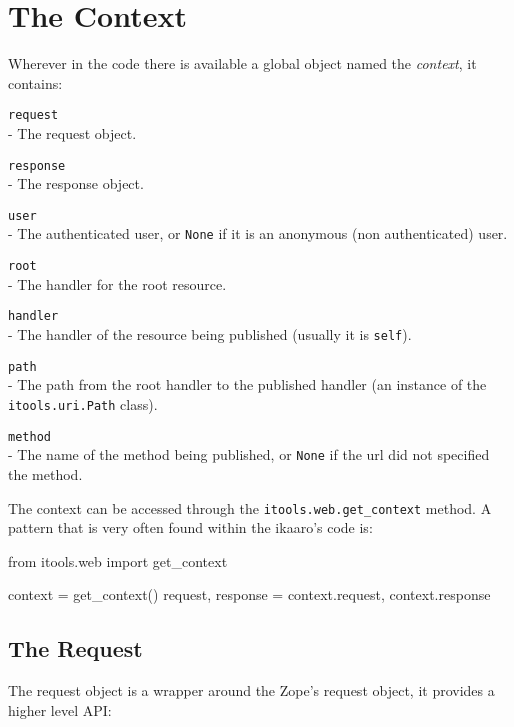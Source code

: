 \section{The Context}

Wherever in the code there is available a global object named the
{\em context}, it contains:

\begin{api}
  {\tt request}\\
  - The request object.

  {\tt response}\\
  - The response object.

  {\tt user}\\
  - The authenticated user, or {\tt None} if it is an anonymous (non
    authenticated) user.

  {\tt root}\\
  - The handler for the root resource.

  {\tt handler}\\
  - The handler of the resource being published (usually it is {\tt self}).

  {\tt path}\\
  - The path from the root handler to the published handler (an instance
    of the {\tt itools.uri.Path} class).

  {\tt method}\\
  - The name of the method being published, or {\tt None} if the url did
    not specified the method.
\end{api}

The context can be accessed through the {\tt itools.web.get\_context}
method. A pattern that is very often found within the ikaaro's code is:

\begin{code}
    from itools.web import get_context

    context = get_context()
    request, response = context.request, context.response
\end{code}


\subsection{The Request}

The request object is a wrapper around the Zope's request object, it
provides a higher level API:

